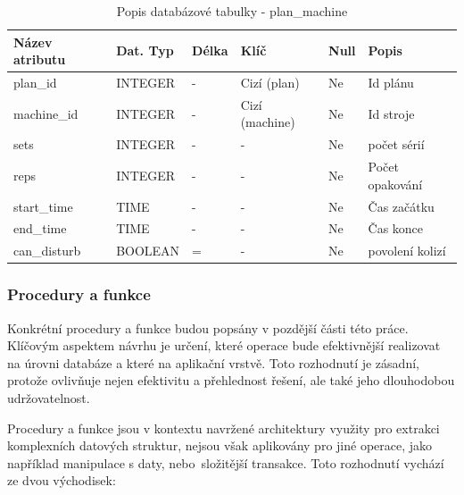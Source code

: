 \begin{table}[ht]
	\caption{Popis databázové tabulky - plan\_machine}
    \label{tab:dat-dictionary-plan-machine}
	\begin{tabular}{|p{3.5cm}|p{2cm}|p{1cm}|p{2.5cm}|p{.75cm}|p{3.75cm}|}
		\hline
        \textbf{Název atributu} & \textbf{Dat. Typ} & \textbf{Délka} & \textbf{Klíč} & \textbf{Null} & \textbf{Popis} \\
        \hline
            plan\_id        & INTEGER   &  -    & Cizí (plan)       & Ne & Id plánu \\
        \hline
            machine\_id     & INTEGER   &  -    & Cizí (machine)       & Ne & Id stroje \\
        \hline
            sets                & INTEGER   &  -   & -                 & Ne & počet sérií\\
        \hline
            reps                & INTEGER   &  -    & -                 & Ne &  Počet opakování \\
        \hline
            start\_time     & TIME      &  -    & -                 & Ne & Čas začátku \\
        \hline
            end\_time       & TIME      &  -    & -                 & Ne & Čas konce \\
        \hline
            can\_disturb          & BOOLEAN   &  =    & -                 & Ne & povolení kolizí \\
        \hline
	\end{tabular}
\end{table}

\subsubsection{Procedury a funkce}
Konkrétní procedury a funkce budou popsány v pozdější části této práce. Klíčovým aspektem návrhu je určení, které operace bude efektivnější realizovat na úrovni databáze a které na aplikační vrstvě. Toto rozhodnutí je zásadní, protože ovlivňuje nejen efektivitu a přehlednost řešení, ale také jeho dlouhodobou udržovatelnost.

Procedury a funkce jsou v kontextu navržené architektury využity pro extrakci komplexních datových struktur, nejsou však aplikovány pro jiné operace, jako například manipulace s daty, nebo~složitější transakce. Toto rozhodnutí vychází ze dvou východisek:

